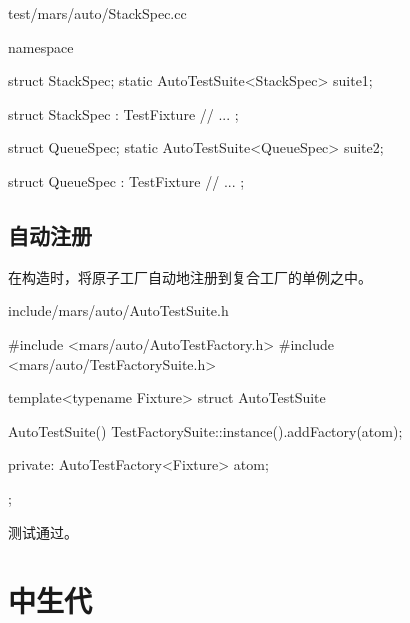 \begin{content}
\begin{nodiff}{test/mars/auto/StackSpec.cc}
\begin{c++}
namespace {
  struct StackSpec;
  static AutoTestSuite<StackSpec> suite1;

  struct StackSpec : TestFixture {
    // ...
  };

  struct QueueSpec;
  static AutoTestSuite<QueueSpec> suite2;

  struct QueueSpec : TestFixture {
    // ...
  };  
}
 \end{c++}
\end{nodiff}

\subsection{自动注册}

在构造时，将原子工厂自动地注册到复合工厂的单例之中。

\begin{nodiff}{include/mars/auto/AutoTestSuite.h}
 \begin{c++}
#include <mars/auto/AutoTestFactory.h>
#include <mars/auto/TestFactorySuite.h>

template<typename Fixture>
struct AutoTestSuite {
  AutoTestSuite() {
    TestFactorySuite::instance().addFactory(atom);
  }

private:
  AutoTestFactory<Fixture> atom;
};
 \end{c++}
\end{nodiff}

测试通过。

\end{content}

\section{中生代}

